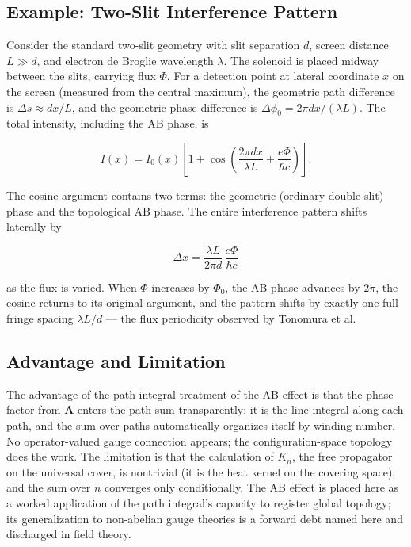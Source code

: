 \subsection{Example: Two-Slit Interference Pattern}

Consider the standard two-slit geometry with slit separation $d$, screen distance $L \gg d$, and electron de Broglie wavelength $\lambda$. The solenoid is placed midway between the slits, carrying flux $\Phi$. For a detection point at lateral coordinate $x$ on the screen (measured from the central maximum), the geometric path difference is $\Delta s \approx d x/L$, and the geometric phase difference is $\Delta\phi_0 = 2\pi d x/(\lambda L)$. The total intensity, including the AB phase, is
\begin{linenomath}
\begin{equation}
I(x) = I_0(x)\left[1 + \cos\left(\frac{2\pi d x}{\lambda L} + \frac{e\Phi}{\hbar c}\right)\right].
\label{eq:ab-two-slit}
\end{equation}
\end{linenomath}
The cosine argument contains two terms: the geometric (ordinary double-slit) phase and the topological AB phase. The entire interference pattern shifts laterally by
\begin{linenomath}
\begin{equation}
\Delta x = \frac{\lambda L}{2\pi d}\,\frac{e\Phi}{\hbar c}
\end{equation}
\end{linenomath}
as the flux is varied. When $\Phi$ increases by $\Phi_0$, the AB phase advances by $2\pi$, the cosine returns to its original argument, and the pattern shifts by exactly one full fringe spacing $\lambda L/d$ --- the flux periodicity observed by Tonomura et al.

\subsection{Advantage and Limitation}

The advantage of the path-integral treatment of the AB effect is that the phase factor from $\bm A$ enters the path sum transparently: it is the line integral along each path, and the sum over paths automatically organizes itself by winding number. No operator-valued gauge connection appears; the configuration-space topology does the work. The limitation is that the calculation of $K_n$, the free propagator on the universal cover, is nontrivial (it is the heat kernel on the covering space), and the sum over $n$ converges only conditionally. The AB effect is placed here as a worked application of the path integral's capacity to register global topology; its generalization to non-abelian gauge theories is a forward debt named here and discharged in field theory.

